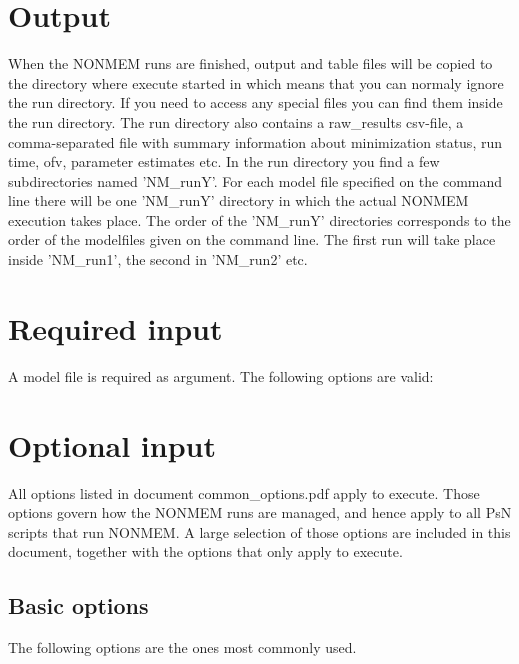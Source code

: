 \section{Output}
When the NONMEM runs are finished, output and table files will be copied to the directory where execute started in which means 
that you can normaly ignore the run directory. If you need to access any special files you can find them inside the run directory. 
The run directory also contains a raw\_results csv-file, a comma-separated file with summary information about minimization status, 
run time, ofv, parameter estimates etc. In the run directory you find a few subdirectories named 'NM\_runY'. For each model file 
specified on the command line there will be one 'NM\_runY' directory in which the actual NONMEM execution takes place. 
The order of the 'NM\_runY' directories corresponds to the order of the 
modelfiles given on the command line. The first run will take place inside 'NM\_run1', the second in 'NM\_run2' etc.

\section{Required input}
A model file is required as argument.
The following options are valid:
\section{Optional input}
All options listed in document common\_options.pdf apply to 
execute. 
Those options govern how the NONMEM runs are managed, 
and hence apply to all PsN scripts that run NONMEM. 
A large selection of those options are included in this document,
together with the options that only apply to execute.
\renewcommand{\guidetoolname}{modelfit}
\subsection{Basic options}
The following options are the ones most commonly used.

\renewcommand{\guidetoolname}{execute}

